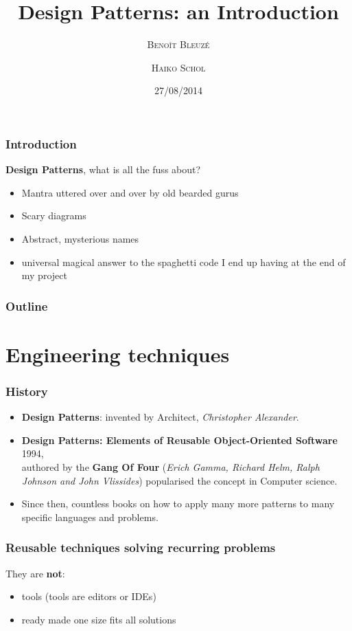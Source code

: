 \documentclass{beamer}
\title
{Design Patterns: an Introduction}
\author[B. Bleuz\'e \and H. Schol] %
{\textsc{Beno\^it Bleuz\'e} \and \textsc{Haiko Schol}}
\date[2014] %
{27/08/2014}
\begin{document}
\begin{frame}
  \titlepage
\end{frame}

\begin{frame}
\frametitle {Introduction}
  \textbf{Design Patterns}, what is all the fuss about?
\begin{itemize}
 \item Mantra uttered over and over by old bearded gurus
 \item Scary diagrams
 \item Abstract, mysterious names
 \item universal magical answer to the spaghetti code I end up having at the end of my project
\end{itemize}
\centering {}
\end{frame}

\begin{frame}
  \frametitle{Outline}
  \tableofcontents
\end{frame}

\section{Engineering techniques}
\begin{frame}
\frametitle {History}
\begin{itemize}
 \item \textbf{Design Patterns}: invented by  Architect, \emph{Christopher Alexander}.\pause
 \item \pause \textbf{Design Patterns: Elements of Reusable Object-Oriented Software} 1994, \\
authored by the \textbf{Gang Of Four} (\emph{Erich Gamma, Richard Helm, Ralph Johnson and John Vlissides}) popularised the concept in Computer science.
 \item \pause Since then, countless books on how to apply many more patterns to many specific languages and problems.
\end{itemize}




\end{frame}
\begin{frame}
 \frametitle{Reusable techniques solving recurring problems}
They are \textbf{not}:
  \begin{itemize}
   \item tools (tools are editors or IDEs)
   \item ready made one size fits all solutions
  \end{itemize}
\end{frame}
\end{document}
